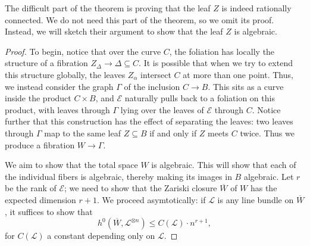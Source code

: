 \documentclass[12pt]{amsart}
\theoremstyle{definition}
\theoremstyle{remark}
\numberwithin{equation}{section}
\begin{document}
The difficult part of the theorem is proving that the leaf \(Z\) is indeed rationally
connected. We do not need this part of the theorem, so we omit its proof. Instead,
we will sketch their argument to show that the leaf \(Z\) is algebraic.

\begin{proof}
To begin, notice that over the curve \(C\), the foliation has locally the structure
of a fibration \(Z_\Delta \to \Delta \subseteq C\). It is possible that when we try
to extend this structure globally, the leaves \(Z_\alpha\) intersect \(C\) at
more than one point. Thus, we instead consider the graph \(\Gamma\) of the inclusion
\(C \to B\). This sits as a curve inside the product \(C \times B\), and
\(\mathcal{E}\) naturally pulls back to a foliation on this product, with leaves
through \(\Gamma\) lying over the leaves of \(\mathcal{E}\) through \(C\).
Notice further that this construction has the effect of separating the leaves:
two leaves through \(\Gamma\) map to the same leaf \(Z \subseteq B\) if and only
if \(Z\) meets \(C\) twice. Thus we produce a fibration \(W \to \Gamma\).

We aim to show that the total space \(W\) is algebraic. This will show that each of
the individual fibers is algebraic, thereby making its images in \(B\) algebraic.
Let \(r\) be the rank of \(\mathcal{E}\); we need to show that the Zariski closure
\(\overline{W}\) of \(W\) has the expected dimension \(r+1\).
We proceed asymtotically: if \(\mathcal{L}\) is any line bundle on \(\overline{W}\), 
it suffices to show that
\begin{equation} \label{eq-asymtotic-bound}
    h^0(\overline{W}, \mathcal{L}^{\otimes n}) \leq C(\mathcal{L}) \cdot n^{r+1},
\end{equation}
for \(C(\mathcal{L})\) a constant depending only on \(\mathcal{L}\).


\end{proof}
\end{document}
